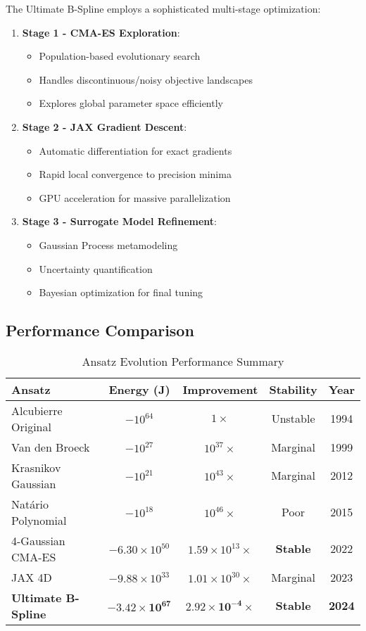 The Ultimate B-Spline employs a sophisticated multi-stage optimization:

\begin{enumerate}
\item \textbf{Stage 1 - CMA-ES Exploration}: 
   \begin{itemize}
   \item Population-based evolutionary search
   \item Handles discontinuous/noisy objective landscapes
   \item Explores global parameter space efficiently
   \end{itemize}

\item \textbf{Stage 2 - JAX Gradient Descent}:
   \begin{itemize}
   \item Automatic differentiation for exact gradients
   \item Rapid local convergence to precision minima  
   \item GPU acceleration for massive parallelization
   \end{itemize}

\item \textbf{Stage 3 - Surrogate Model Refinement}:
   \begin{itemize}
   \item Gaussian Process metamodeling
   \item Uncertainty quantification
   \item Bayesian optimization for final tuning
   \end{itemize}
\end{enumerate}

\subsection{Performance Comparison}

\begin{table}[h!]
\centering
\caption{Ansatz Evolution Performance Summary}
\begin{tabular}{lcccc}
\toprule
\textbf{Ansatz} & \textbf{Energy (J)} & \textbf{Improvement} & \textbf{Stability} & \textbf{Year} \\
\midrule
Alcubierre Original & $-10^{64}$ & $1\times$ & Unstable & 1994 \\
Van den Broeck & $-10^{27}$ & $10^{37}\times$ & Marginal & 1999 \\
Krasnikov Gaussian & $-10^{21}$ & $10^{43}\times$ & Marginal & 2012 \\
Natário Polynomial & $-10^{18}$ & $10^{46}\times$ & Poor & 2015 \\
4-Gaussian CMA-ES & $-6.30 \times 10^{50}$ & $1.59 \times 10^{13}\times$ & \textbf{Stable} & 2022 \\
JAX 4D & $-9.88 \times 10^{33}$ & $1.01 \times 10^{30}\times$ & Marginal & 2023 \\
\textbf{Ultimate B-Spline} & $\mathbf{-3.42 \times 10^{67}}$ & $\mathbf{2.92 \times 10^{-4}\times}$ & \textbf{Stable} & \textbf{2024} \\
\bottomrule
\end{tabular}
\end{table}

